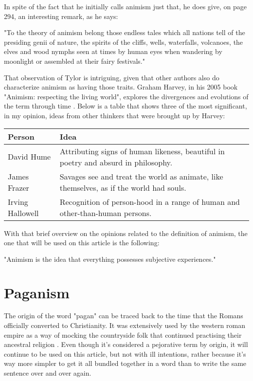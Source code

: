 In spite of the fact that he initially calls animism just that, he does give, on page 294, an interesting
remark, as he says:

\begin{center}
    \itshape
    \parbox{0.7\textwidth}{
    "To the theory of animism belong those endless tales which all nations tell of the presiding genii
    of nature, the spirits of the cliffs, wells, waterfalls, volcanoes, the elves and wood nymphs seen
    at times by human eyes when wandering by moonlight or assembled at their fairy festivals." 
    }
\end{center}

That observation of Tylor is intriguing, given that other authors also do characterize animism
as having those traits. Graham Harvey, in his 2005 book "Animism: respecting the living world", explores
the divergences and evolutions of the term through time \cite{Harvey2005}. Below is a table that shows
three of the most significant, in my opinion, ideas from other thinkers that were brought up by Harvey:

\begin{center}
    \begin{tabularx}{\textwidth}{||>{\raggedright\arraybackslash}X|>{\raggedleft\arraybackslash}X||} 
     \hline
     Person & Idea \\ [0.5ex] 
     \hline\hline
     David Hume & Attributing signs of human likeness, beautiful in poetry and absurd in philosophy. \\ 
     \hline
     James Frazer & Savages see and treat the world as animate, like themselves, as if the world had souls.\\
     \hline
     Irving Hallowell & Recognition of person-hood in a range of human and other-than-human persons. \\ [1ex]
     \hline
    \end{tabularx}
\end{center}

With that brief overview on the opinions related to the definition of animism, the one that will be used
on this article is the following:

\begin{center}
    \itshape
    \parbox{0.7\textwidth}{
    "Animism is the idea that everything possesses subjective experiences." 
    }
\end{center}

\section{Paganism}
The origin of the word "pagan" can be traced back to the time that the Romans officially converted to
Christianity. It was extensively used by the western roman empire as a way of mocking the countryside
folk that continued practising their ancestral religion \cite{Bowersock1999}. Even though it's considered
a pejorative term by origin, it will continue to be used on this article, but not with ill
intentions, rather because it's way more simpler to get it all bundled together in a word than to
write the same sentence over and over again.

